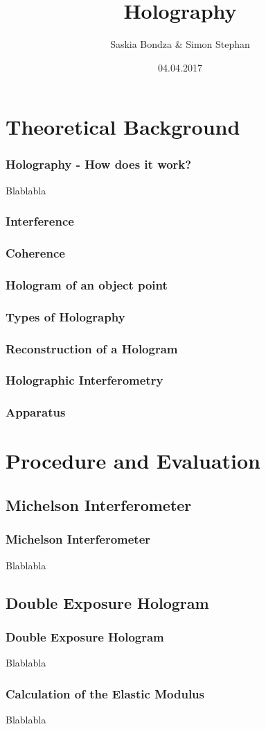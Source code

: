 \documentclass{beamer}
\title{Holography}
\author{Saskia Bondza \& Simon Stephan}
\date{04.04.2017}
\begin{document}
\maketitle
\frame{\tableofcontents}
\section{Theoretical Background}
\frame{\tableofcontents[currentsection]}
\begin{frame}
	\frametitle{Holography - How does it work?}
	Blablabla
\end{frame}
\begin{frame}
	\frametitle{Interference}

\end{frame}
\begin{frame}
	\frametitle{Coherence}
\end{frame}
\begin{frame}
	\frametitle{Hologram of an object point}
\end{frame}
\begin{frame}
	\frametitle{Types of Holography}
\end{frame}
\begin{frame}
	\frametitle{Reconstruction of a Hologram}
\end{frame}
\begin{frame}
	\frametitle{Holographic Interferometry}
\end{frame}
\begin{frame}
	\frametitle{Apparatus}
\end{frame}
\section{Procedure and Evaluation}
\frame{\tableofcontents[currentsection]}
\subsection{Michelson Interferometer}
\frame{\tableofcontents[currentsubsection]}
\begin{frame}
	\frametitle{Michelson Interferometer}
	Blablabla
\end{frame}
\subsection{Double Exposure Hologram}
\frame{\tableofcontents[currentsubsection]}
\begin{frame}
	\frametitle{Double Exposure Hologram}
	Blablabla
\end{frame}
\begin{frame}
	\frametitle{Calculation of the Elastic Modulus}
	Blablabla
\end{frame}
\end{document}
